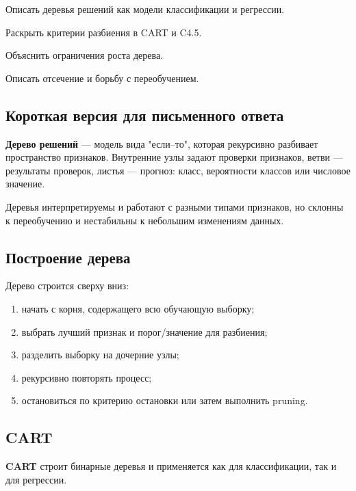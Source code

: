
\begin{examplan}
    \item Описать деревья решений как модели классификации и регрессии.
    \item Раскрыть критерии разбиения в CART и C4.5.
    \item Объяснить ограничения роста дерева.
    \item Описать отсечение и борьбу с переобучением.
\end{examplan}

\subsection*{Короткая версия для письменного ответа}

\textbf{Дерево решений} --- модель вида "если--то", которая рекурсивно разбивает пространство признаков. Внутренние узлы задают проверки признаков, ветви --- результаты проверок, листья --- прогноз: класс, вероятности классов или числовое значение.

Деревья интерпретируемы и работают с разными типами признаков, но склонны к переобучению и нестабильны к небольшим изменениям данных.

\subsection*{Построение дерева}

Дерево строится сверху вниз:
\begin{enumerate}
    \item начать с корня, содержащего всю обучающую выборку;
    \item выбрать лучший признак и порог/значение для разбиения;
    \item разделить выборку на дочерние узлы;
    \item рекурсивно повторять процесс;
    \item остановиться по критерию остановки или затем выполнить pruning.
\end{enumerate}

\subsection*{CART}

\textbf{CART} строит бинарные деревья и применяется как для классификации, так и для регрессии.

